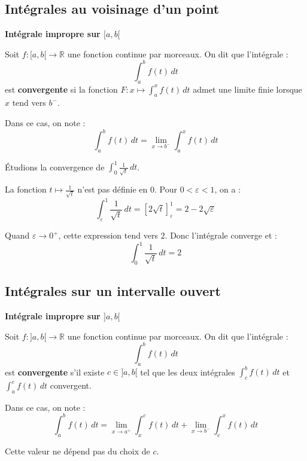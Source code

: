 \documentclass[../PolyS4.tex]{subfiles}
\begin{document}
\subsection{Intégrales au voisinage d'un point}

\begin{Def}
\textbf{Intégrale impropre sur $[a, b[$}

Soit $f:[a, b[\rightarrow \mathbb{R}$ une fonction continue par morceaux. On dit que l'intégrale :
$$\int_{a}^{b} f(t) \, dt$$
est \textbf{convergente} si la fonction $F : x \mapsto \int_{a}^{x} f(t) \, dt$ admet une limite finie lorsque $x$ tend vers $b^{-}$.

Dans ce cas, on note :
$$\int_{a}^{b} f(t) \, dt = \lim_{x \to b^{-}} \int_{a}^{x} f(t) \, dt$$
\end{Def}

\begin{Ex}
Étudions la convergence de $\displaystyle\int_{0}^{1} \frac{1}{\sqrt{t}} \, dt$.

La fonction $t \mapsto \frac{1}{\sqrt{t}}$ n'est pas définie en $0$. Pour $0 < \varepsilon < 1$, on a :
$$\int_{\varepsilon}^{1} \frac{1}{\sqrt{t}} \, dt = \left[2\sqrt{t}\right]_{\varepsilon}^{1} = 2 - 2\sqrt{\varepsilon}$$

Quand $\varepsilon \to 0^{+}$, cette expression tend vers $2$. Donc l'intégrale converge et :
$$\int_{0}^{1} \frac{1}{\sqrt{t}} \, dt = 2$$
\end{Ex}

\newpage

\subsection{Intégrales sur un intervalle ouvert}

\begin{Def}
\textbf{Intégrale impropre sur $]a, b[$}

Soit $f:]a, b[\rightarrow \mathbb{R}$ une fonction continue par morceaux. On dit que l'intégrale :
$$\int_{a}^{b} f(t) \, dt$$
est \textbf{convergente} s'il existe $c \in ]a, b[$ tel que les deux intégrales $\displaystyle\int_{c}^{b} f(t) \, dt$ et $\displaystyle\int_{a}^{c} f(t) \, dt$ convergent.

Dans ce cas, on note :
$$\int_{a}^{b} f(t) \, dt = \lim_{x \rightarrow a^{+}} \int_{x}^{c} f(t) \, dt + \lim_{x \rightarrow b^{-}} \int_{c}^{x} f(t) \, dt$$

Cette valeur ne dépend pas du choix de $c$.
\end{Def}
\end{document}
